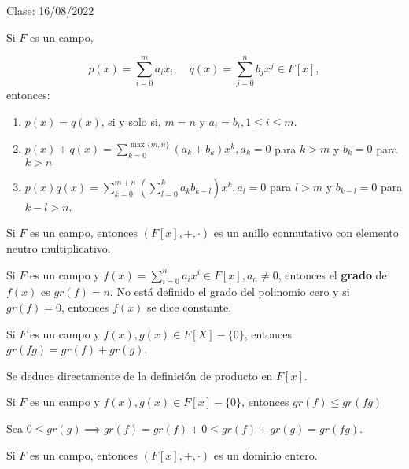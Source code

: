 Clase: 16/08/2022

\begin{definicion}
    Si $F$ es un campo, 

    $$p(x)=\sum_{i=0}^m a_ix_i,\quad q(x)=\sum_{j=0}^n b_jx^j\in F[x],$$
    entonces:
    \begin{enumerate}
        \item $p(x)=q(x)$, si y solo si, $m=n$ y $a_i=b_i,1\leq i\leq m$.
        \item $p(x)+q(x)=\sum_{k=0}^{\max\{m,n\}}(a_k+b_k)x^k,a_k=0$ para $k>m$ y $b_k=0$ para $k>n$
        \item $p(x)q(x)=\sum_{k=0}^{m+n}\left(\sum_{l=0}^k a_kb_{k-l}\right)x^k, a_l=0$ para $l>m$ y  $b_{k-l}=0$ para $k-l>n$. 
    \end{enumerate}
\end{definicion}

\begin{prop}
    Si $F$ es un campo, entonces $(F[x],+,\cdot)$ es un anillo conmutativo con elemento neutro multiplicativo. 
\end{prop}

\begin{definicion}
    Si $F$ es un campo y $f(x)=\sum_{i=0}^na_ix^i\in F[x], a_n\neq 0$, entonces el \textbf{grado} de $f(x)$ es $gr(f)=n$. No está definido el grado del polinomio cero y si $gr(f)=0$, entonces $f(x)$ se dice constante. 
\end{definicion}

\begin{lema}[3.17]
    Si $F$ es un campo y $f(x),g(x)\in F[X]-\{0\}$, entonces $gr(fg)=gr(f)+gr(g)$.
    \begin{dem}
        Se deduce directamente de la definición de producto en $F[x]$.
    \end{dem}
\end{lema}

\begin{corolario}
    Si $F$ es un campo y $f(x),g(x)\in F[x]-\{0\}$, entonces $gr(f)\leq gr(fg)$
    \begin{dem}
        Sea $0\leq gr(g)\implies gr(f)=gr(f)+0\leq gr(f)+gr(g)=gr(fg)$.
    \end{dem}
\end{corolario}

\begin{corolario}
    Si $F$ es un campo, entonces $(F[x],+,\cdot)$ es un dominio entero. 
\end{corolario}

